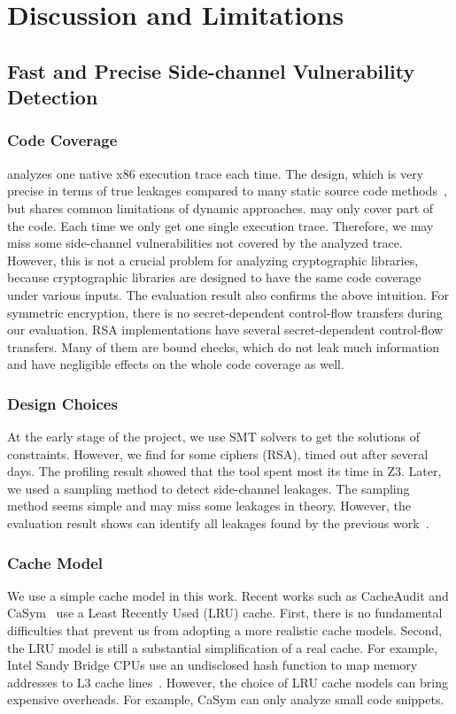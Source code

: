 \chapter{Discussion and Limitations}\label{chapter6}
\section{Fast and Precise Side-channel Vulnerability Detection}
\subsection*{Code Coverage} \detect{} analyzes one native x86 execution trace each time. The design, which is very precise in terms of true leakages compared to many static source code methods~\cite{197207,BacelarAlmeida:2013:FVS:2483313.2483334}, but shares common limitations of dynamic approaches. \detect{} may only cover part of the code. Each time we only get one single execution trace. Therefore, we may miss some side-channel vulnerabilities not covered by the analyzed trace. However, this is not a crucial problem for analyzing cryptographic libraries, because cryptographic libraries are designed to have the same code coverage under various inputs. The evaluation result also confirms the above intuition. For symmetric encryption, there is no secret-dependent control-flow transfers during our evaluation. RSA implementations have several secret-dependent control-flow transfers. Many of them are bound checks, which do not leak much information and have negligible effects on the whole code coverage as well.

\subsection*{Design Choices} At the early stage of the project, we use SMT solvers to get the solutions of constraints. However, we find for some ciphers (RSA), \detect{} timed out after several days. The profiling result showed that the tool spent most its time in Z3. Later, we used a sampling method to detect side-channel leakages. The sampling method seems simple and may miss some leakages in theory. However, the evaluation result shows \detect{} can identify all leakages found by the previous work~\cite{203878,236338,Brotzman19Casym}.  

\subsection*{Cache Model} We use a simple cache model in this work. Recent works such as CacheAudit and CaSym~\cite{Brotzman19Casym,182946} use a Least Recently Used (LRU) cache. First, there is no fundamental difficulties that prevent us from adopting a more realistic cache models. Second, the LRU model is still a substantial simplification of a real cache. For example, Intel Sandy Bridge CPUs use an undisclosed hash function to map memory addresses to L3 cache lines~\cite{farshin2019make}. However, the choice of LRU  cache models can bring expensive overheads. For example, CaSym can only analyze small code snippets.

